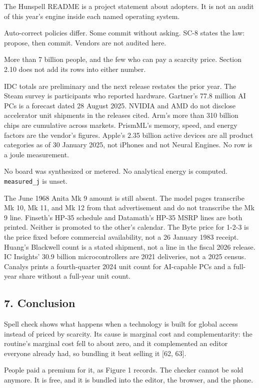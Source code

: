 \documentclass[
  10pt,
]{article}
\begin{document}
The Hunspell README is a project statement about adopters. It is not an
audit of this year's engine inside each named operating system.

Auto-correct policies differ. Some commit without asking. SC-8 states
the law: propose, then commit. Vendors are not audited here.

More than 7 billion people, and the few who can pay a scarcity price.
Section 2.10 does not add its rows into either number.

IDC totals are preliminary and the next release restates the prior year.
The Steam survey is participants who reported hardware. Gartner's 77.8
million AI PCs is a forecast dated 28 August 2025. NVIDIA and AMD do not
disclose accelerator unit shipments in the releases cited. Arm's more
than 310 billion chips are cumulative across markets. PrismML's memory,
speed, and energy factors are the vendor's figures. Apple's 2.35 billion
active devices are all product categories as of 30 January 2025, not
iPhones and not Neural Engines. No row is a joule measurement.

No board was synthesized or metered. No analytical energy is computed.
\texttt{measured\_j} is unset.

The June 1968 Anita Mk 9 amount is still absent. The model pages
transcribe Mk 10, Mk 11, and Mk 12 from that advertisement and do not
transcribe the Mk 9 line. Finseth's HP-35 schedule and Datamath's HP-35
MSRP lines are both printed. Neither is promoted to the other's
calendar. The Byte price for 1-2-3 is the price fixed before commercial
availability, not a 26 January 1983 receipt. Huang's Blackwell count is
a stated shipment, not a line in the fiscal 2026 release. IC Insights'
30.9 billion microcontrollers are 2021 deliveries, not a 2025 census.
Canalys prints a fourth-quarter 2024 unit count for AI-capable PCs and a
full-year share without a full-year unit count.

\subsection{7. Conclusion}\label{conclusion}

Spell check shows what happens when a technology is built for global
access instead of priced by scarcity. Its cause is marginal cost and
complementarity: the routine's marginal cost fell to about zero, and it
complemented an editor everyone already had, so bundling it beat selling
it {[}62, 63{]}.

People paid a premium for it, as Figure 1 records. The checker cannot be
sold anymore. It is free, and it is bundled into the editor, the
browser, and the phone.
\end{document}
